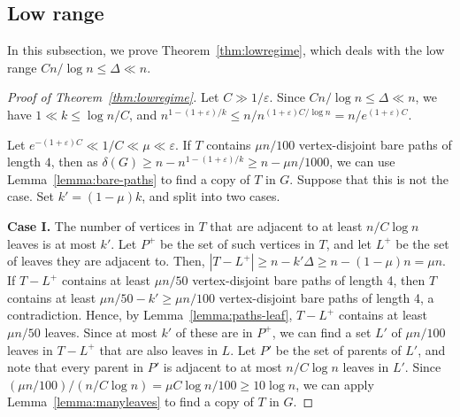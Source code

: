 \documentclass{article}
\theoremstyle{plain}
\theoremstyle{definition}
\numberwithin{equation}{section}
\def\eps{\varepsilon}
\begin{document}
\subsection{Low range}\label{sec:main2}%
In this subsection, we prove Theorem~\ref{thm:lowregime}, which deals with the low range $Cn/\log n\leq\Delta\ll n$.
\begin{proof}[Proof of Theorem~\ref{thm:lowregime}]
Let $C\gg1/\eps$. Since $Cn/\log n\leq\Delta\ll n$, we have $1\ll k\leq\log n/C$, and $n^{1-(1+\eps)/k}\leq n/n^{(1+\eps)C/\log n}=n/e^{(1+\eps)C}$.

Let $e^{-(1+\eps)C}\ll1/C\ll\mu\ll\eps$. If $T$ contains $\mu n/100$ vertex-disjoint bare paths of length $4$, then as $\delta(G)\geq n-n^{1-(1+\eps)/k}\geq n-\mu n/1000$, we can use Lemma~\ref{lemma:bare-paths} to find a copy of $T$ in $G$. Suppose that this is not the case. Set $k'=(1-\mu)k$, and split into two cases. 

\medskip

\noindent\textbf{Case I.} The number of vertices in $T$ that are adjacent to at least $n/C\log n$ leaves is at most $k'$. Let $P^+$ be the set of such vertices in $T$, and let $L^+$ be the set of leaves they are adjacent to. Then, $|T-L^+|\geq n-k'\Delta\geq n-(1-\mu)n=\mu n$. If $T-L^+$ contains at least $\mu n/50$ vertex-disjoint bare paths of length 4, then $T$ contains at least $\mu n/50-k'\geq\mu n/100$ vertex-disjoint bare paths of length 4, a contradiction. Hence, by Lemma~\ref{lemma:paths-leaf}, $T-L^+$ contains at least $\mu n/50$ leaves. Since at most $k'$ of these are in $P^+$, we can find a set $L'$ of $\mu n/100$ leaves in $T-L^+$ that are also leaves in $L$. Let $P'$ be the set of parents of $L'$, and note that every parent in $P'$ is adjacent to at most $n/C\log n$ leaves in $L'$. Since $(\mu n/100)/(n/C\log n)=\mu C\log n/100\geq10\log n$, we can apply Lemma~\ref{lemma:manyleaves} to find a copy of $T$ in $G$. 

\medskip


\end{proof}
\end{document}
